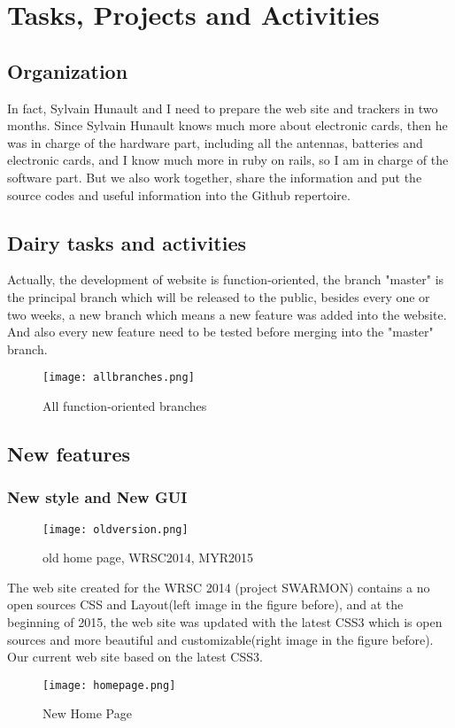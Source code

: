 \section{Tasks, Projects and Activities}
\subsection{Organization}
In fact, Sylvain Hunault and I need to prepare the web site and trackers in two months. Since Sylvain Hunault knows much more about electronic cards, then he was in charge of the hardware part, including all the antennas, batteries and electronic cards, and I know much more in ruby on rails, so I am in charge of the software part. But we also work together, share the information and put the source codes and useful information into the Github repertoire.
\subsection{Dairy tasks and activities}
Actually, the development of website is function-oriented, the branch "master" is the principal branch which will be released to the public, besides every one or two weeks, a new branch which means a new feature was added into the website. And also every new feature need to be tested before merging into the "master" branch.

\begin{figure}[h!]
    \centering
    \texttt{[image: allbranches.png]}
    \caption{All function-oriented branches }
    \label{fig-sample}
\end{figure}

\subsection{New features}
\subsubsection{New style and New GUI}
\begin{figure}[h!]
\centering
\texttt{[image: oldversion.png]}
\caption{old home page, WRSC2014, MYR2015 }
\label{fig-sample}
\end{figure}
The web site created for the WRSC 2014 (project SWARMON) contains a no open sources CSS and Layout(left image in the figure before), and at the beginning of 2015, the web site was updated with the latest CSS3 which is open sources and more beautiful and customizable(right image in the figure before). Our current web site based on the latest CSS3.
\begin{figure}[h!]
\centering
\texttt{[image: homepage.png]}
\caption{New Home Page }
\end{figure}

